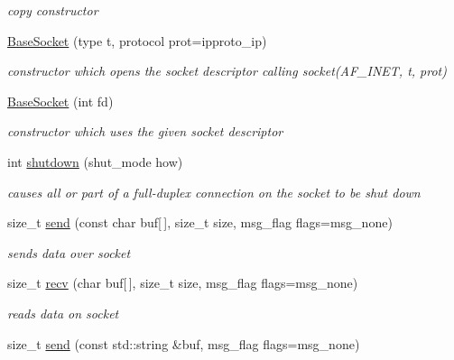 \begin{CompactItemize}
\begin{CompactItemize}
\begin{CompactList}\small\item\em copy constructor \item\end{CompactList}\item 
\hyperlink{classsocketpp_1_1BaseSocket_35c982d7aef2041c100439cf38aa7f4d}{BaseSocket} (type t, protocol prot=ipproto\_\-ip)
\begin{CompactList}\small\item\em constructor which opens the socket descriptor calling socket(AF\_\-INET, t, prot) \item\end{CompactList}\item 
\hyperlink{classsocketpp_1_1BaseSocket_f7e18d6700868abb2b476e797506eafb}{BaseSocket} (int fd)
\begin{CompactList}\small\item\em constructor which uses the given socket descriptor \item\end{CompactList}\item 
int \hyperlink{classsocketpp_1_1BaseSocket_7550a79d05baaf4b19c20fa0fa9bc8b9}{shutdown} (shut\_\-mode how)
\begin{CompactList}\small\item\em causes all or part of a full-duplex connection on the socket to be shut down \item\end{CompactList}\item 
size\_\-t \hyperlink{classsocketpp_1_1BaseSocket_a63e58c917c6be09f641f9ff1830e74a}{send} (const char buf\mbox{[}$\,$\mbox{]}, size\_\-t size, msg\_\-flag flags=msg\_\-none)
\begin{CompactList}\small\item\em sends data over socket \item\end{CompactList}\item 
size\_\-t \hyperlink{classsocketpp_1_1BaseSocket_d74160ecc96cacec56f61d36f9ab747d}{recv} (char buf\mbox{[}$\,$\mbox{]}, size\_\-t size, msg\_\-flag flags=msg\_\-none)
\begin{CompactList}\small\item\em reads data on socket \item\end{CompactList}\item 
size\_\-t \hyperlink{classsocketpp_1_1BaseSocket_8a5fa7a9374964d7978285a003301b9d}{send} (const std::string \&buf, msg\_\-flag flags=msg\_\-none)

\end{CompactItemize}
\end{CompactItemize}
